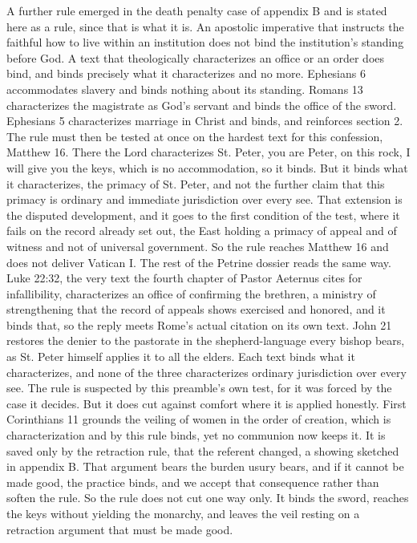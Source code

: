 \documentclass[11pt,twoside]{article}
\newcommand{\unit}[1]{\needspace{3\baselineskip}\par\medskip{\normalfont\bfseries\color{subhead}#1}\par\nobreak\smallskip}
\begin{document}
\unit{Accommodation and characterization.}
A further rule emerged in the death penalty case of appendix B and is stated here as a rule, since that is what it is. An apostolic imperative that instructs the faithful how to live within an institution does not bind the institution's standing before God. A text that theologically characterizes an office or an order does bind, and binds precisely what it characterizes and no more. Ephesians 6 accommodates slavery and binds nothing about its standing. Romans 13 characterizes the magistrate as God's servant and binds the office of the sword. Ephesians 5 characterizes marriage in Christ and binds, and reinforces section 2. The rule must then be tested at once on the hardest text for this confession, Matthew 16. There the Lord characterizes St. Peter, you are Peter, on this rock, I will give you the keys, which is no accommodation, so it binds. But it binds what it characterizes, the primacy of St. Peter, and not the further claim that this primacy is ordinary and immediate jurisdiction over every see. That extension is the disputed development, and it goes to the first condition of the test, where it fails on the record already set out, the East holding a primacy of appeal and of witness and not of universal government. So the rule reaches Matthew 16 and does not deliver Vatican I. The rest of the Petrine dossier reads the same way. Luke 22:32, the very text the fourth chapter of Pastor Aeternus cites for infallibility, characterizes an office of confirming the brethren, a ministry of strengthening that the record of appeals shows exercised and honored, and it binds that, so the reply meets Rome's actual citation on its own text. John 21 restores the denier to the pastorate in the shepherd-language every bishop bears, as St. Peter himself applies it to all the elders. Each text binds what it characterizes, and none of the three characterizes ordinary jurisdiction over every see. The rule is suspected by this preamble's own test, for it was forced by the case it decides. But it does cut against comfort where it is applied honestly. First Corinthians 11 grounds the veiling of women in the order of creation, which is characterization and by this rule binds, yet no communion now keeps it. It is saved only by the retraction rule, that the referent changed, a showing sketched in appendix B. That argument bears the burden usury bears, and if it cannot be made good, the practice binds, and we accept that consequence rather than soften the rule. So the rule does not cut one way only. It binds the sword, reaches the keys without yielding the monarchy, and leaves the veil resting on a retraction argument that must be made good.
\end{document}
